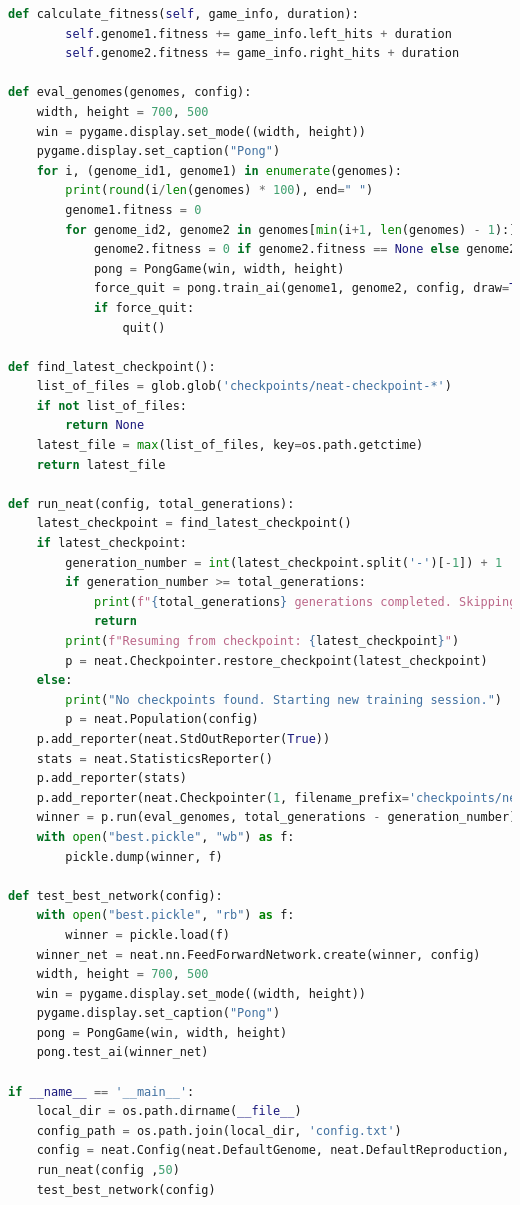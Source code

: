 \documentclass[10pt]{article}
\begin{document}
\begin{lstlisting}[language=Python, caption=main.py code]
    def calculate_fitness(self, game_info, duration):
        self.genome1.fitness += game_info.left_hits + duration
        self.genome2.fitness += game_info.right_hits + duration

def eval_genomes(genomes, config):
    width, height = 700, 500
    win = pygame.display.set_mode((width, height))
    pygame.display.set_caption("Pong")
    for i, (genome_id1, genome1) in enumerate(genomes):
        print(round(i/len(genomes) * 100), end=" ")
        genome1.fitness = 0
        for genome_id2, genome2 in genomes[min(i+1, len(genomes) - 1):]:
            genome2.fitness = 0 if genome2.fitness == None else genome2.fitness
            pong = PongGame(win, width, height)
            force_quit = pong.train_ai(genome1, genome2, config, draw=True)
            if force_quit:
                quit()

def find_latest_checkpoint():
    list_of_files = glob.glob('checkpoints/neat-checkpoint-*')
    if not list_of_files:
        return None
    latest_file = max(list_of_files, key=os.path.getctime)
    return latest_file

def run_neat(config, total_generations):
    latest_checkpoint = find_latest_checkpoint()
    if latest_checkpoint:
        generation_number = int(latest_checkpoint.split('-')[-1]) + 1
        if generation_number >= total_generations:
            print(f"{total_generations} generations completed. Skipping training.")
            return
        print(f"Resuming from checkpoint: {latest_checkpoint}")
        p = neat.Checkpointer.restore_checkpoint(latest_checkpoint)
    else:
        print("No checkpoints found. Starting new training session.")
        p = neat.Population(config)
    p.add_reporter(neat.StdOutReporter(True))
    stats = neat.StatisticsReporter()
    p.add_reporter(stats)
    p.add_reporter(neat.Checkpointer(1, filename_prefix='checkpoints/neat-checkpoint-'))
    winner = p.run(eval_genomes, total_generations - generation_number)
    with open("best.pickle", "wb") as f:
        pickle.dump(winner, f)

def test_best_network(config):
    with open("best.pickle", "rb") as f:
        winner = pickle.load(f)
    winner_net = neat.nn.FeedForwardNetwork.create(winner, config)
    width, height = 700, 500
    win = pygame.display.set_mode((width, height))
    pygame.display.set_caption("Pong")
    pong = PongGame(win, width, height)
    pong.test_ai(winner_net)

if __name__ == '__main__':
    local_dir = os.path.dirname(__file__)
    config_path = os.path.join(local_dir, 'config.txt')
    config = neat.Config(neat.DefaultGenome, neat.DefaultReproduction, neat.DefaultSpeciesSet, neat.DefaultStagnation, config_path)
    run_neat(config ,50)
    test_best_network(config)
\end{lstlisting}
\end{document}
